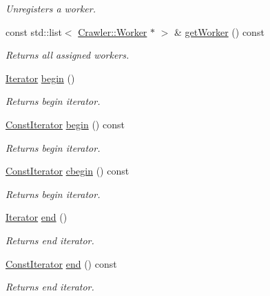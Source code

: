 \begin{DoxyCompactItemize}
\begin{DoxyCompactList}\small\item\em Unregisters a worker. \end{DoxyCompactList}\item 
const std\+::list$<$ \hyperlink{class_crawler_1_1_worker}{Crawler\+::\+Worker} $\ast$ $>$ \& \hyperlink{class_crawler_1_1_website_a1f59eed6d2245e66021602ee9808c303}{get\+Worker} () const 
\begin{DoxyCompactList}\small\item\em Returns all assigned workers. \end{DoxyCompactList}\item 
\hyperlink{class_crawler_1_1_website_ad323c2cfd249fc9cd2692c00eb50c0c9}{Iterator} \hyperlink{class_crawler_1_1_website_aae6db6037312d6fad6ae2ff01000fd64}{begin} ()
\begin{DoxyCompactList}\small\item\em Returns begin iterator. \end{DoxyCompactList}\item 
\hyperlink{class_crawler_1_1_website_acfbc2b2241aa025f4fc57965dfe69fdb}{Const\+Iterator} \hyperlink{class_crawler_1_1_website_afcbc63478703d83dd768b28b6c012f2e}{begin} () const 
\begin{DoxyCompactList}\small\item\em Returns begin iterator. \end{DoxyCompactList}\item 
\hyperlink{class_crawler_1_1_website_acfbc2b2241aa025f4fc57965dfe69fdb}{Const\+Iterator} \hyperlink{class_crawler_1_1_website_a1625142f1eb62413e46421a9be7ae66e}{cbegin} () const 
\begin{DoxyCompactList}\small\item\em Returns begin iterator. \end{DoxyCompactList}\item 
\hyperlink{class_crawler_1_1_website_ad323c2cfd249fc9cd2692c00eb50c0c9}{Iterator} \hyperlink{class_crawler_1_1_website_a6d640935e728869e08f10f7a2b8c91e2}{end} ()
\begin{DoxyCompactList}\small\item\em Returns end iterator. \end{DoxyCompactList}\item 
\hyperlink{class_crawler_1_1_website_acfbc2b2241aa025f4fc57965dfe69fdb}{Const\+Iterator} \hyperlink{class_crawler_1_1_website_a156de4df95ad623d00a1cea69cb99bbd}{end} () const 
\begin{DoxyCompactList}\small\item\em Returns end iterator. \end{DoxyCompactList}\item 

\end{DoxyCompactItemize}
